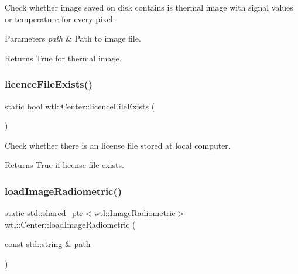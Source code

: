 Check whether image saved on disk contains is thermal image with signal values or temperature for every pixel. 


\begin{DoxyParams}{Parameters}
{\em path} & Path to image file. \\
\hline
\end{DoxyParams}
\begin{DoxyReturn}{Returns}
True for thermal image. 
\end{DoxyReturn}
\mbox{\label{classwtl_1_1_center_a96d895bb3a977d2f69a72f688b0174c2}} 
\subsubsection{\texorpdfstring{licence\+File\+Exists()}{licenceFileExists()}}
{\footnotesize\ttfamily static bool wtl\+::\+Center\+::licence\+File\+Exists (\begin{DoxyParamCaption}{ }\end{DoxyParamCaption})\hspace{0.3cm}{\ttfamily [static]}}



Check whether there is an license file stored at local computer. 

\begin{DoxyReturn}{Returns}
True if license file exists. 
\end{DoxyReturn}
\mbox{\label{classwtl_1_1_center_a977533acfaafc905d9751b31ed3293e5}} 
\subsubsection{\texorpdfstring{load\+Image\+Radiometric()}{loadImageRadiometric()}}
{\footnotesize\ttfamily static std\+::shared\+\_\+ptr$<$\hyperlink{classwtl_1_1_image_radiometric}{wtl\+::\+Image\+Radiometric}$>$ wtl\+::\+Center\+::load\+Image\+Radiometric (\begin{DoxyParamCaption}\item[{const std\+::string \&}]{path }\end{DoxyParamCaption})\hspace{0.3cm}{\ttfamily [static]}}



